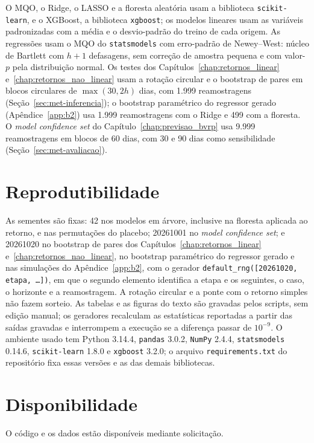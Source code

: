 O MQO, o Ridge, o LASSO e a floresta aleatória usam a biblioteca
\texttt{scikit-learn}, e o XGBoost, a biblioteca \texttt{xgboost}; os modelos
lineares usam as variáveis padronizadas com a média e o desvio-padrão do
treino de cada origem. As regressões usam o MQO do \texttt{statsmodels} com
erro-padrão de Newey--West: núcleo de Bartlett com $h+1$ defasagens, sem
correção de amostra pequena e com valor-$p$ pela distribuição normal. Os
testes dos Capítulos~\ref{chap:retornos_linear} e~\ref{chap:retornos_nao_linear}
usam a rotação circular e o bootstrap de pares em blocos circulares de
$\max(30, 2h)$ dias, com 1.999 reamostragens (Seção~\ref{sec:met-inferencia});
o bootstrap paramétrico do regressor gerado (Apêndice~\ref{app:b2}) usa
1.999 reamostragens com o Ridge e 499 com a floresta.
O \textit{model confidence set} do Capítulo~\ref{chap:previsao_bvrp} usa 9.999
reamostragens em blocos de 60 dias, com 30 e 90 dias como sensibilidade
(Seção~\ref{sec:met-avaliacao}).

\section*{Reprodutibilidade}

As sementes são fixas: 42 nos modelos em árvore, inclusive na floresta
aplicada ao retorno, e nas permutações do placebo; 20261001 no
\textit{model confidence set}; e 20261020 no bootstrap de pares dos
Capítulos~\ref{chap:retornos_linear} e~\ref{chap:retornos_nao_linear}, no
bootstrap paramétrico do regressor gerado e nas simulações do
Apêndice~\ref{app:b2},
com o gerador \texttt{default\_rng([20261020, etapa, \ldots])}, em que o
segundo elemento identifica a etapa e os seguintes, o caso, o horizonte e a
reamostragem. A rotação circular e a ponte com o retorno simples não fazem
sorteio. As
tabelas e as figuras do texto
são gravadas pelos scripts, sem edição manual; os geradores recalculam as
estatísticas reportadas a partir das saídas gravadas e interrompem a execução
se a diferença passar de $10^{-9}$. O ambiente usado tem Python 3.14.4,
\texttt{pandas} 3.0.2, \texttt{NumPy} 2.4.4, \texttt{statsmodels} 0.14.6,
\texttt{scikit-learn} 1.8.0 e \texttt{xgboost} 3.2.0; o arquivo
\texttt{requirements.txt} do repositório fixa essas versões e as das demais
bibliotecas.

\section*{Disponibilidade}

O código e os dados estão disponíveis mediante solicitação.
